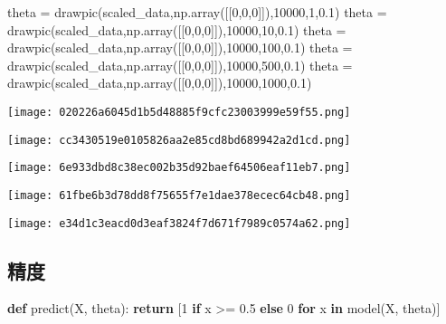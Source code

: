\documentclass[
]{article}
\newenvironment{Shaded}{}{}
\newcommand{\ControlFlowTok}[1]{\textcolor[rgb]{0.00,0.44,0.13}{\textbf{#1}}}
\newcommand{\DecValTok}[1]{\textcolor[rgb]{0.25,0.63,0.44}{#1}}
\newcommand{\FloatTok}[1]{\textcolor[rgb]{0.25,0.63,0.44}{#1}}
\newcommand{\KeywordTok}[1]{\textcolor[rgb]{0.00,0.44,0.13}{\textbf{#1}}}
\newcommand{\NormalTok}[1]{#1}
\newcommand{\OperatorTok}[1]{\textcolor[rgb]{0.40,0.40,0.40}{#1}}
\begin{document}
\begin{Shaded}
\begin{Highlighting}[]
\NormalTok{theta }\OperatorTok{=}\NormalTok{ drawpic(scaled\_data,np.array([[}\DecValTok{0}\NormalTok{,}\DecValTok{0}\NormalTok{,}\DecValTok{0}\NormalTok{]]),}\DecValTok{10000}\NormalTok{,}\DecValTok{1}\NormalTok{,}\FloatTok{0.1}\NormalTok{)}
\NormalTok{theta }\OperatorTok{=}\NormalTok{ drawpic(scaled\_data,np.array([[}\DecValTok{0}\NormalTok{,}\DecValTok{0}\NormalTok{,}\DecValTok{0}\NormalTok{]]),}\DecValTok{10000}\NormalTok{,}\DecValTok{10}\NormalTok{,}\FloatTok{0.1}\NormalTok{)}
\NormalTok{theta }\OperatorTok{=}\NormalTok{ drawpic(scaled\_data,np.array([[}\DecValTok{0}\NormalTok{,}\DecValTok{0}\NormalTok{,}\DecValTok{0}\NormalTok{]]),}\DecValTok{10000}\NormalTok{,}\DecValTok{100}\NormalTok{,}\FloatTok{0.1}\NormalTok{)}
\NormalTok{theta }\OperatorTok{=}\NormalTok{ drawpic(scaled\_data,np.array([[}\DecValTok{0}\NormalTok{,}\DecValTok{0}\NormalTok{,}\DecValTok{0}\NormalTok{]]),}\DecValTok{10000}\NormalTok{,}\DecValTok{500}\NormalTok{,}\FloatTok{0.1}\NormalTok{)}
\NormalTok{theta }\OperatorTok{=}\NormalTok{ drawpic(scaled\_data,np.array([[}\DecValTok{0}\NormalTok{,}\DecValTok{0}\NormalTok{,}\DecValTok{0}\NormalTok{]]),}\DecValTok{10000}\NormalTok{,}\DecValTok{1000}\NormalTok{,}\FloatTok{0.1}\NormalTok{)}
\end{Highlighting}
\end{Shaded}

\texttt{[image: 020226a6045d1b5d48885f9cfc23003999e59f55.png]}

\texttt{[image: cc3430519e0105826aa2e85cd8bd689942a2d1cd.png]}

\texttt{[image: 6e933dbd8c38ec002b35d92baef64506eaf11eb7.png]}

\texttt{[image: 61fbe6b3d78dd8f75655f7e1dae378ecec64cb48.png]}

\texttt{[image: e34d1c3eacd0d3eaf3824f7d671f7989c0574a62.png]}

\hypertarget{ux7cbeux5ea6}{%
\subsection{精度}\label{ux7cbeux5ea6}}

\begin{Shaded}
\begin{Highlighting}[]
\KeywordTok{def}\NormalTok{ predict(X, theta):}
    \ControlFlowTok{return}\NormalTok{ [}\DecValTok{1} \ControlFlowTok{if}\NormalTok{ x }\OperatorTok{\textgreater{}=} \FloatTok{0.5} \ControlFlowTok{else} \DecValTok{0} \ControlFlowTok{for}\NormalTok{ x }\KeywordTok{in}\NormalTok{ model(X, theta)]}
\end{Highlighting}
\end{Shaded}
\end{document}

